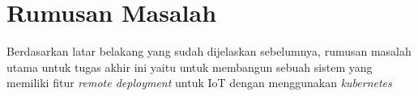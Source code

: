 \section{Rumusan Masalah}

Berdasarkan latar belakang yang sudah dijelaskan sebelumnya, rumusan masalah utama untuk tugas akhir ini yaitu untuk membangun sebuah sistem yang memiliki fitur \textit{remote deployment} untuk IoT dengan menggunakan \textit{kubernetes}
